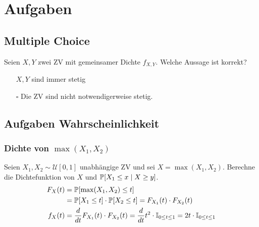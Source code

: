 \section{Aufgaben}
\subsection{Multiple Choice}

Seien \(X,Y\) zwei ZV mit gemeinsamer Dichte \(f_{X,Y}\). Welche Aussage ist korrekt?
\begin{itemize}
	\item[\checkmark] \(X,Y\) sind immer stetig
	\item[\(\square\)] Die ZV sind nicht notwendigerweise stetig.
\end{itemize}



\subsection{Aufgaben Wahrscheinlichkeit}
\subsubsection*{\texorpdfstring{Dichte von \(\max(X_1,X_2)\)}{Dichte von max()}}

Seien \(X_1, X_2 \sim \mathcal{U}[0,1]\) unabhängige ZV und sei \(X = \max (X_1, X_2)\). Berechne die Dichtefunktion von \(X\) und \(\P[X_1 \leq x \mid X \geq y]\).
\begin{align*}
	F_X(t) & = \P[\max(X_1, X_2) \leq t]                                                                                                              \\ &= \P[X_1 \leq t] \cdot \P[X_2 \leq t] = F_{X_1}(t) \cdot F_{X_2}(t) \\
	f_X(t) & = \frac{d}{dt} F_{X_1}(t) \cdot F_{X_2}(t) = \frac{d}{dt} t^2 \cdot \mathbb{I}_{0 \leq t \leq 1} = 2t \cdot \mathbb{I}_{0 \leq t \leq 1}
\end{align*}

